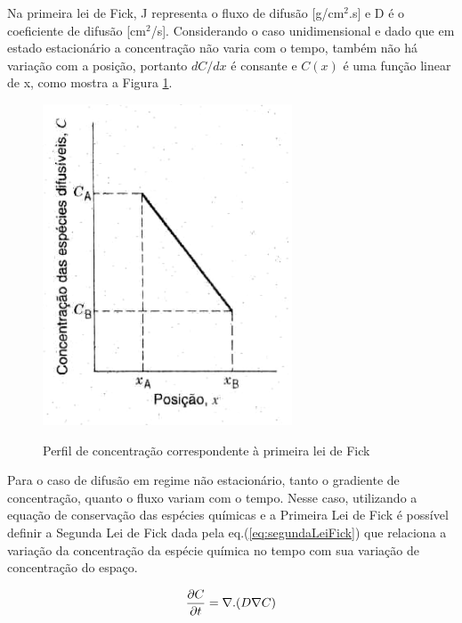 \documentclass[]{politex}
\begin{document}
	Na primeira lei de Fick, J representa o fluxo de difusão [g/cm$^2$.s] e D é o coeficiente de difusão [cm$^2$/s]. Considerando o caso unidimensional e dado que em estado estacionário a concentração não varia com o tempo, também não há variação com a posição, portanto $dC/dx$ é consante e $C(x)$ é uma função linear de x, como mostra a Figura \ref{fig:primeiraLei}. \par
	
	\begin{figure}[ht]
	\caption{Perfil de concentração correspondente à primeira lei de Fick}
	\includegraphics{primeiraLei}
	\label{fig:primeiraLei}
	\centering
	\end{figure}

	Para o caso de difusão em regime não estacionário, tanto o gradiente de concentração, quanto o fluxo variam com o tempo. Nesse caso, utilizando a equação de conservação das espécies químicas e a Primeira Lei de Fick é possível definir a Segunda Lei de Fick dada pela eq.(\autoref{eq:segundaLeiFick}) que relaciona a variação da concentração da espécie química no tempo com sua variação de concentração do espaço. \par

\begin{equation} \label{eq:segundaLeiFick}
 \pdv{C}{t} = \nabla.(D\nabla C)
\end{equation}
\end{document}
